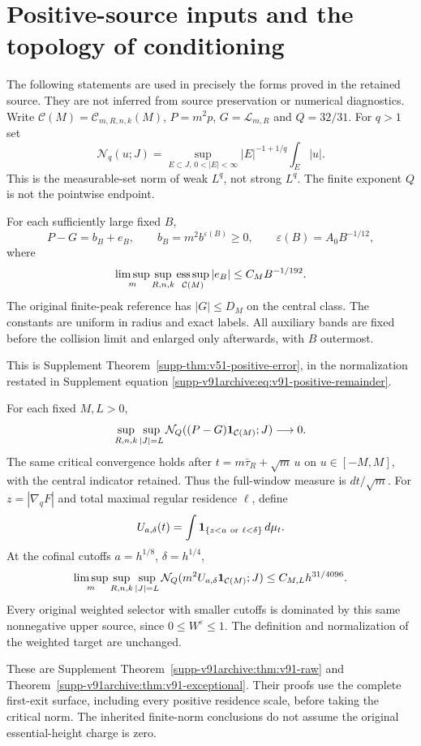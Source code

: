 \section{Positive-source inputs and the topology of conditioning}
\label{sec:v92-inputs}
The following statements are used in precisely the forms proved in the
retained source. They are not inferred from source preservation or
numerical diagnostics. Write $\mathcal C(M)=\mathcal C_{m,R,n,k}(M)$,
$P=m^2p$, $G=\mathcal L_{m,R}$ and $Q=32/31$. For $q>1$ set
\[
 \mathcal N_q(u;J)=\sup_{E\subset J,\,0<|E|<\infty}
                         |E|^{-1+1/q}\int_E|u|.
\]
This is the measurable-set norm of weak $L^q$, not strong $L^q$.
The finite exponent $Q$ is not the pointwise endpoint.

\begin{inputstatement}
\label{input:v92-scalar}
For each sufficiently large fixed $B$,
\begin{equation}\label{eq:v92-positive-input}
 P-G=b_B+e_B,\qquad b_B=m^2b^{\varepsilon(B)}\ge0,\qquad
 \varepsilon(B)=A_0B^{-1/12},
\end{equation}
where
\[
 \limsup_m\sup_{R,n,k}\operatorname*{ess\,sup}_{\mathcal C(M)}|e_B|
                                       \le C_MB^{-1/192}.
\]
The original finite-peak reference has $|G|\le D_M$ on the central
class. The constants are uniform in radius and exact labels. All
auxiliary bands are fixed before the collision limit and enlarged
only afterwards, with $B$ outermost.
\end{inputstatement}
This is Supplement Theorem~\ref{supp-thm:v51-positive-error}, in the
normalization restated in Supplement equation
\eqref{supp-v91archive:eq:v91-positive-remainder}.

\begin{inputstatement}
\label{input:v92-critical}
For each fixed $M,L>0$,
\[
 \sup_{R,n,k}\sup_{|J|=L}
      \mathcal N_Q((P-G)\mathbf1_{\mathcal C(M)};J)\longrightarrow0.
\]
The same critical convergence holds after
$t=m\bar\tau_R+\sqrt m\,u$ on $u\in[-M,M]$, with the central
indicator retained. Thus the full-window measure is $dt/\sqrt m$.
For $z=|\nabla_qF|$ and total maximal regular residence $\ell$, define
\[
 U_{a,\delta}(t)=\int\one_{\{z<a\ \mathrm{or}\ \ell<\delta\}}\,d\mu_t.
\]
At the cofinal cutoffs $a=h^{1/8}$, $\delta=h^{1/4}$,
\begin{equation}\label{eq:v92-union-input}
 \limsup_m\sup_{R,n,k}\sup_{|J|=L}
 \mathcal N_Q(m^2U_{a,\delta}\one_{\mathcal C(M)};J)
                                   \le C_{M,L}h^{31/4096}.
\end{equation}
Every original weighted selector with smaller cutoffs is dominated by
this same nonnegative upper source, since $0\le W^\varepsilon\le1$.
The definition and normalization of the weighted target are unchanged.
\end{inputstatement}
These are Supplement Theorem~\ref{supp-v91archive:thm:v91-raw} and
Theorem~\ref{supp-v91archive:thm:v91-exceptional}. Their proofs use
the complete first-exit surface, including every positive residence
scale, before taking the critical norm. The inherited finite-norm
conclusions do not assume the original essential-height charge is zero.

